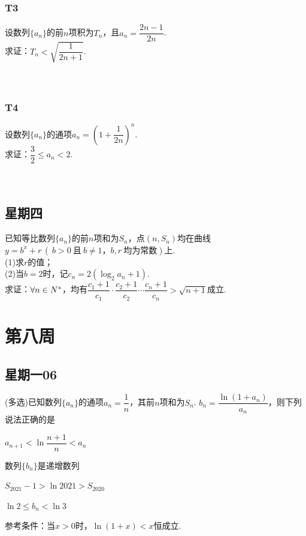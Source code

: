 \documentclass[UTF8,a4paper,11 pt]{ctexart}%
\let\mathbb\relax
\begin{document}
	\subsubsection{T3}\noindent
	设数列$ \{a_n\} $的前$ n $项积为$ T_n $，且$ a_n=\dfrac{2n-1}{2n} $.
	\\求证：$ T_n<\sqrt{\dfrac{1}{2n+1}} $.
	\\\,\\\,
	\subsubsection{T4}\noindent
	设数列$ \{a_n\} $的通项$ a_n=\left(1+\dfrac{1}{2n}\right)^n $.
	\\求证：$ \dfrac{3}{2}\le a_n<2 $.
	\\\,\\\,
	\subsection{星期四}\noindent
	已知等比数列$ \{a_n\} $的前$ n $项和为$ S_n $，点$ (n,S_n) $均在曲线$ y=b^x+r\,(\:b>0\:\text{且}\:b\ne1\text{，}b,r\:\text{均为常数}) $上.
	\\(1)求$ r $的值；
	\\(2)当$ b=2 $时，记$ c_n=2(\log_2a_n+1) $. 
	\\求证：$ \forall n\in\mathbb{N^*} $，均有$ \dfrac{c_1+1}{c_1}\cdot\dfrac{c_2+1}{c_2}\cdots\dfrac{c_n+1}{c_n}>\sqrt{n+1} $成立.
	\section{第八周}
	\subsection{星期一06}\noindent
	(多选)已知数列$ \{a_n\} $的通项$ a_n=\dfrac{1}{n} $，其前$ n $项和为$ S_n $. $ b_n=\dfrac{\ln(1+a_n)}{a_n} $，则下列说法正确的是\begin{xchoices}[label-style=Alph]
		\item $ a_{n+1}<\ln\dfrac{n+1}{n}<a_n $
		\item 数列$ \{b_n\} $是递增数列
		\item $ S_{2021}-1>\ln2021>S_{2020} $
		\item $ \ln2\le b_n<\ln3 $
	\end{xchoices}\noindent
	参考条件：当$ x>0
	 $时，$ \ln(1+x)<x $恒成立.
	\\\,\\\,\\\,\\\,
\end{document}

